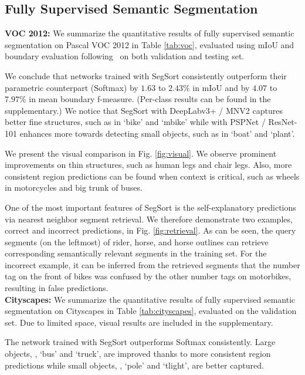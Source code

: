 \documentclass[10pt,twocolumn,letterpaper]{article}
\begin{document}
\subsection{Fully Supervised Semantic Segmentation}
\label{sec:exp_fully}


\noindent \textbf{VOC 2012:} We summarize the quantitative results of fully supervised semantic segmentation on Pascal VOC 2012 \cite{pascal-voc-2012} in Table \ref{tab:voc}, evaluated using mIoU and boundary evaluation following~\cite{arbelaez2011contour,aaf2018} on both validation and testing set.

We conclude that networks trained with SegSort consistently outperform their parametric counterpart (Softmax) by $1.63$ to $2.43\%$ in mIoU and by $4.07$ to $7.97\%$ in mean boundary f-measure. (Per-class results can be found in the supplementary.) We notice that SegSort with DeepLabv3+ / MNV2 captures better fine structures, such as in `bike' and `mbike' while with PSPNet / ResNet-101 enhances more towards detecting small objects, such as in `boat' and `plant'.

We present the visual comparison in Fig. \ref{fig:visual}. We observe prominent improvements on thin structures, such as human legs and chair legs. Also, more consistent region predictions can be found when context is critical, such as wheels in motorcycles and big trunk of buses.

One of the most important features of SegSort is the self-explanatory predictions via nearest neighbor segment retrieval. We therefore demonstrate two examples, correct and incorrect predictions, in Fig. \ref{fig:retrieval}. As can be seen, the query segments (on the leftmost) of rider, horse, and horse outlines can retrieve corresponding semantically relevant segments in the training set. For the incorrect example, it can be inferred from the retrieved segments that the number tag on the front of bikes was confused by the other number tags on motorbikes, resulting in false predictions. \\


\vspace{-6pt}
\noindent \textbf{Cityscapes:} We summarize the quantitative results of fully supervised semantic segmentation on Cityscapes \cite{cordts2016cityscapes} in Table \ref{tab:cityscapes}, evaluated on the validation set. Due to limited space, visual results are included in the supplementary. 

The network trained with SegSort outperforms Softmax consistently. Large objects, \eg, `bus' and `truck', are improved thanks to more consistent region predictions while small objects, \eg, `pole' and `tlight', are better captured.
\end{document}
